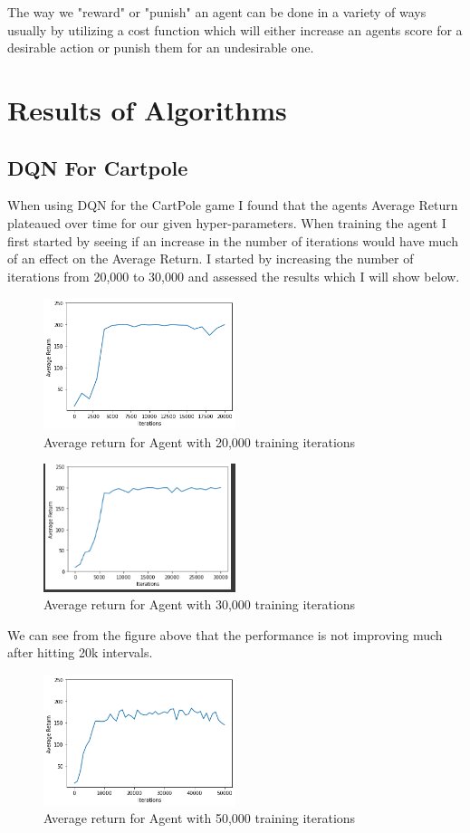 \documentclass[conference]{IEEEtran}
\begin{document}
The way we "reward" or "punish" an agent can be done in a variety of ways usually by utilizing a cost function which will either increase an agents score for a desirable action or punish them for an undesirable one.

\section{Results of Algorithms}
\subsection{DQN For Cartpole}
When using DQN for the CartPole game I found that the agents Average Return plateaued over time for our given hyper-parameters.  When training the agent I first started by seeing if an increase in the number of iterations would have much of an effect on the Average Return.  I started by increasing the number of iterations from 20,000 to 30,000 and assessed the results which I will show below.
\begin{figure}[h]
\caption{Average return for Agent with 20,000 training iterations}
\centering
\includegraphics[width=0.5\textwidth]{Images/DQN20k.png}
\end{figure}
\begin{figure}[H]
\caption{Average return for Agent with 30,000 training iterations}
\centering
\includegraphics[width=0.5\textwidth]{Images/DQN30k.png}
\end{figure}
We can see from the figure above that the performance is not improving much after hitting 20k intervals. 
\begin{figure}[H]
\caption{Average return for Agent with 50,000 training iterations}
\centering
\includegraphics[width=0.5\textwidth]{Images/DQN50k.png}
\end{figure}
\end{document}
